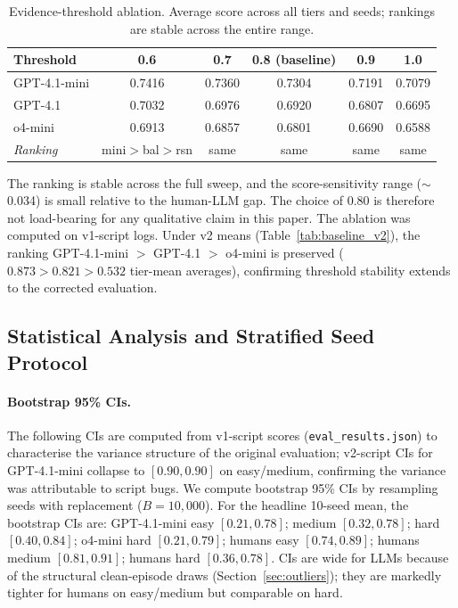 \documentclass{article}
\begin{document}
\begin{table}[h]
\centering
\caption{Evidence-threshold ablation.  Average score across all tiers
and seeds; rankings are stable across the entire range.}
\label{tab:threshold}
\small
\begin{tabular}{lccccc}
\toprule
\textbf{Threshold} & 0.6 & 0.7 & \textbf{0.8} (baseline) & 0.9 & 1.0 \\
\midrule
GPT-4.1-mini & 0.7416 & 0.7360 & 0.7304 & 0.7191 & 0.7079 \\
GPT-4.1      & 0.7032 & 0.6976 & 0.6920 & 0.6807 & 0.6695 \\
o4-mini      & 0.6913 & 0.6857 & 0.6801 & 0.6690 & 0.6588 \\
\midrule
\textit{Ranking}\, & mini$>$bal$>$rsn & same & same & same & same \\
\bottomrule
\end{tabular}
\end{table}

The ranking is stable across the full sweep, and the score-sensitivity
range ($\sim$0.034) is small relative to the human-LLM gap.  The
choice of $0.80$ is therefore not load-bearing for any qualitative
claim in this paper.
The ablation was computed on v1-script logs.  Under v2 means
(Table~\ref{tab:baseline_v2}), the ranking GPT-4.1-mini $>$ GPT-4.1
$>$ o4-mini is preserved ($0.873 > 0.821 > 0.532$ tier-mean averages),
confirming threshold stability extends to the corrected evaluation.

\subsection{Statistical Analysis and Stratified Seed Protocol}
\label{sec:stats}

\paragraph{Bootstrap 95\% CIs.}
The following CIs are computed from v1-script scores
(\texttt{eval\_results.json}) to characterise the variance structure of
the original evaluation; v2-script CIs for GPT-4.1-mini collapse to
$[0.90, 0.90]$ on easy/medium, confirming the variance was attributable
to script bugs.
We compute bootstrap 95\% CIs by resampling seeds with replacement
($B{=}10{,}000$).  For the headline 10-seed mean, the bootstrap CIs are:
GPT-4.1-mini easy $[0.21, 0.78]$; medium $[0.32, 0.78]$; hard
$[0.40, 0.84]$; o4-mini hard $[0.21, 0.79]$; humans easy
$[0.74, 0.89]$; humans medium $[0.81, 0.91]$; humans hard
$[0.36, 0.78]$.  CIs are wide for LLMs because of the structural
clean-episode draws (Section~\ref{sec:outliers}); they are markedly
tighter for humans on easy/medium but comparable on hard.
\end{document}
